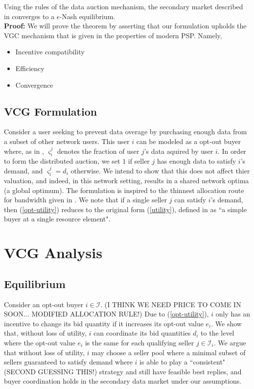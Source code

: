 \documentclass[12pt]{article}
\theoremstyle{definition}
\newcommand{\vs}{\varsigma}
\newcommand{\mcI}{\mathcal{I}}
\begin{document}
\begin{multicols}{2}
{
Using the rules of the data auction mechanism, the secondary market described in \cite{zheng} converges to a $\epsilon$-Nash equilibrium.
}\\
\textbf{Proof:}
We will prove the theorem by asserting that our formulation upholds the VGC
mechanism that is given in the properties of modern PSP. Namely,
\begin{itemize}
    \item Incentive compatibility
    \item Efficiency 
    \item Convergence
\end{itemize}

\subsection{VCG Formulation}
Consider a user seeking to prevent
data overage by purchasing enough data from a subset of other network users.
This user $i$ can be modeled as a opt-out buyer where, as in \cite{semret}, $\vs_i^j$ denotes the
fraction of user $j$'s data aquired by user $i$. In order to form the
distributed auction, we set $1$ if seller $j$ has enough data to
satisfy $i$'s demand, and $\vs_i^j=d_i$ otherwise. We intend to show that this
does not affect thier valuation, and indeed, in this network setting, results in a shared network optima (a
global optimum). The formulation is inspired to the thinnest allocation route for
bandwidth given in \cite{lazar}. We note that if a single seller $j$ can
satisfy $i$'s demand, then
(\ref{opt-utility}) reduces to the original form (\ref{utility}), defined in
\cite{semret} as ``a simple buyer at a single resource element".

\section{VCG Analysis}
\subsection{Equilibrium}

Consider an opt-out buyer $i\in\mcI$. 
(I THINK WE NEED PRICE TO COME IN SOON... MODIFIED ALLOCATION RULE!)
Due to (\ref{opt-utility}), $i$ only has an incentive to change its bid
quantity if it increases its opt-out value $e_i$. 
We show that, without loss of utility, $i$ can coordinate its
bid quantities $d_i$ to the level where the opt-out value $e_i$ 
 is the same for each qualifying seller $j \in\mcI_i$. We argue
that without loss of utility, $i$ may choose a seller pool where a minimal subset
of sellers guaranteed to satisfy demand where $i$ is able to play a
``consistent" (SECOND GUESSING THIS!)
strategy and still have feasible best replies, and buyer
coordination holds in the secondary data market under our assumptions.


\end{multicols}
\end{document}
